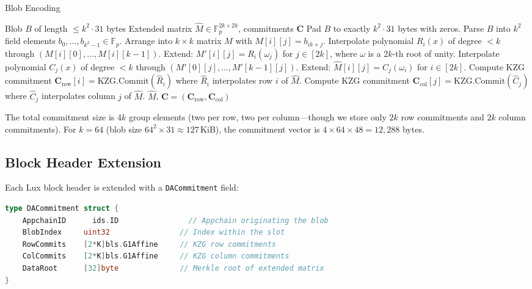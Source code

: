 \begin{algorithm}[H]
\caption{Blob Encoding}
\label{alg:blob-encoding}
\begin{algorithmic}[1]
\Require Blob $B$ of length $\leq k^2 \cdot 31$ bytes
\Ensure Extended matrix $\hat{M} \in \mathbb{F}_p^{2k \times 2k}$, commitments $\mathbf{C}$
\State Pad $B$ to exactly $k^2 \cdot 31$ bytes with zeros.
\State Parse $B$ into $k^2$ field elements $b_0, \ldots, b_{k^2-1} \in \mathbb{F}_p$.
\State Arrange into $k \times k$ matrix $M$ with $M[i][j] = b_{ik + j}$.
    \State Interpolate polynomial $R_i(x)$ of degree $< k$ through $(M[i][0], \ldots, M[i][k-1])$.
    \State Extend: $M'[i][j] = R_i(\omega_j)$ for $j \in [2k]$, where $\omega$ is a $2k$-th root of unity.
\EndFor
{}
    \State Interpolate polynomial $C_j(x)$ of degree $< k$ through $(M'[0][j], \ldots, M'[k-1][j])$.
    \State Extend: $\hat{M}[i][j] = C_j(\omega_i)$ for $i \in [2k]$.
\EndFor
{}
    \State Compute KZG commitment $\mathbf{C}_{\text{row}}[i] = \text{KZG.Commit}(\hat{R}_i)$ where
           $\hat{R}_i$ interpolates row $i$ of $\hat{M}$.
\EndFor
{}
    \State Compute KZG commitment $\mathbf{C}_{\text{col}}[j] = \text{KZG.Commit}(\hat{C}_j)$ where
           $\hat{C}_j$ interpolates column $j$ of $\hat{M}$.
\EndFor
\State \Return $\hat{M}$, $\mathbf{C} = (\mathbf{C}_{\text{row}}, \mathbf{C}_{\text{col}})$
\end{algorithmic}
\end{algorithm}

The total commitment size is $4k$ group elements (two per row, two per column---though we
store only $2k$ row commitments and $2k$ column commitments). For $k = 64$ (blob size
$64^2 \times 31 \approx 127$\,KiB), the commitment vector is $4 \times 64 \times 48 = 12{,}288$
bytes.

\subsection{Block Header Extension}

Each Lux block header is extended with a \texttt{DACommitment} field:

\begin{lstlisting}[language=Go, caption={DACommitment structure}]
type DACommitment struct {
    AppchainID      ids.ID                // Appchain originating the blob
    BlobIndex     uint32                // Index within the slot
    RowCommits    [2*K]bls.G1Affine     // KZG row commitments
    ColCommits    [2*K]bls.G1Affine     // KZG column commitments
    DataRoot      [32]byte              // Merkle root of extended matrix
}
\end{lstlisting}

